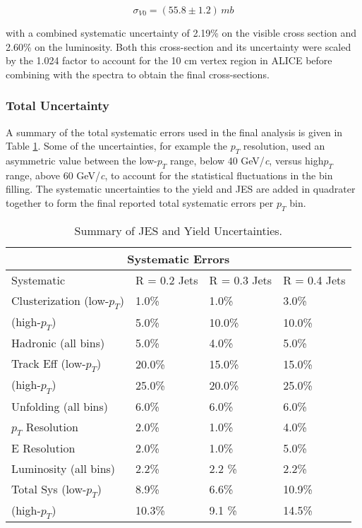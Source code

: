 \begin{equation}
\sigma_{V0} = (55.8 \pm 1.2) \, mb
\label{eq:xlumdef}
\end{equation}

\noindent
with a combined systematic uncertainty of 2.19\% on the visible cross section and 2.60\% on the luminosity.  Both this cross-section and its uncertainty were scaled by the 1.024 factor to account for the 10 cm vertex region in ALICE before combining with the spectra to obtain the final cross-sections.


\subsubsection{Total Uncertainty}

A summary of the total systematic errors used in the final analysis is given in Table \ref{table:1}.  Some of the uncertainties, for example the $p_{T}$ resolution, used an asymmetric value between the low-$p_{T}$ range, below 40 GeV/\textit{c}, versus high$p_{T}$ range, above 60 GeV/\textit{c}, to account for the statistical fluctuations in the bin filling.  The systematic uncertainties to the yield and JES are added in quadrater together to form the final reported total systematic errors per $p_{T}$ bin.
\newline

\begin{table}[h!]
\centering
\begin{tabular}{ |p{5cm}||p{3cm}|p{3cm}|p{3cm}|  }
 \hline
 \multicolumn{4}{|c|}{Systematic Errors} \\
 \hline
 Systematic &R = 0.2 Jets & R = 0.3 Jets& R = 0.4 Jets\\
 \hline
Clusterization (low-$p_{T}$) & 1.0\%    &1.0\%&  3.0\%\\
 (high-$p_{T}$)           &  5.0\%  & 10.0\%   &  10.0\%\\
Hadronic (all bins)&   5.0\% & 4.0\% & 5.0\%\\
Track Eff (low-$p_{T}$)&20.0\% & 15.0\% & 15.0\%\\
 (high-$p_{T}$)            &  25.0\%  & 20.0\%   &  25.0\%\\
Unfolding (all bins)& 6.0\% & 6.0\%&  6.0\%\\
$p_{T}$ Resolution & 2.0\% & 1.0\% & 4.0\%\\
E Resolution& 2.0\%   &1.0\% & 5.0\%\\
Luminosity (all bins) & 2.2\%  & 2.2 \% & 2.2\%\\
 \hline
 \hline
Total Sys (low-$p_{T}$) & 8.9\%  & 6.6\% & 10.9\%\\
(high-$p_{T}$) & 10.3\%  & 9.1 \% & 14.5\%\\
\hline
\end{tabular}
\caption{Summary of JES and Yield Uncertainties.}
\label{table:1}
\end{table}


